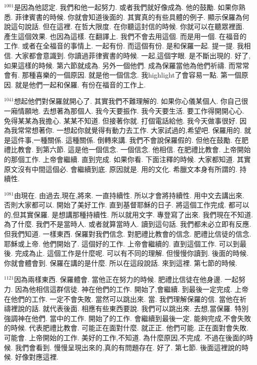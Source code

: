 \documentclass{book}
\begin{document}
$^{1001}$是因為他認定.
我們和他一起努力.
或者我們就好像成為.
他的鼓勵.
如果你熟悉.
菲律賓書的時候.
你就會知道後面的.
其實真的有些具體的例子.
顯示保羅為何說這句說話.
但在這裡.
在哲大限度.
在你聽這封信的時候.
你就可以在聽眾裡面.
產生這個效果.
也因為這樣.
在翻譯上.
我們不會去用這個.
而是用一個.
在福音的工作.
或者在全福音的事情上.
一起有份.
而這個有份.
是和保羅一起.
提一提.
我相信.
大家都會意識到.
你讀過菲律賓書的時候.
一起,這個字眼.
是不斷出現的.
好了,如果這樣的時候.
第六節就成為.
另外一個他們.
成為保羅當他為他們祈禱.
而常常會有.
那種喜樂的一個原因.
就是他一個信念.
我highlight了會容易一點.
第一個原因.
就是他們一起和保羅.
有份在福音的工作上.

$^{1041}$想起他們對保羅就開心了.
其實我們不難理解的.
如果你心儀某個人.
你自己很一廂情願地.
去想著為那個人.
我今天要振作.
我今天要生活.
要工作得開開心心.
免得某某為我擔心.
某某不知道.
但接著你就.
打個電話給他.
我今天做事很好.
因為我常常想著你.
一想起你就覺得有動力去工作.
大家試過的,希望吧.
保羅用的.
就是這件事,一種關係.
這種關係.
倒轉來講.
我們不會說保羅假的.
但他在鼓勵.
在肥禮比教會.
到第六節.
這是他一個信念.
一個信念.
他相信.
在肥禮比教會.
上帝開始的那個工作.
上帝會繼續.
直到完成.
如果你看.
下面注釋的時候.
大家都知道.
其實原文沒有中間這個必.
會繼續到底.
原因就是.
用的文化.
希臘文本身有所謂的.
持續性.

$^{1081}$由現在.
由過去,現在,將來.
一直持續性.
所以才會將持續性.
用中文去講出來.
否則大家都可以.
開始了美好工作.
直到基督耶穌的日子.
將這個工作完成.
都可以的,但其實保羅.
是想講那種持續性.
所以就用文字.
專登寫了出來.
我們現在不知道.
為了什麼.
我們不是當時人.
或者就算當時人.
讀到這句話.
我們都未必立即有反應.
但我們知道.
一樣東西.
保羅對我們信念.
對肥禮比教會的信念.
肥禮比信徒的信念.
耶穌或上帝.
他們開始了.
這個好的工作.
上帝會繼續的.
直到這個工作.
可以到最後.
完成為止.
這個工作是什麼呢.
可以有不同的理解.
但慢慢你讀到.
後面的時候.
你就會體會到.
保羅在講的是什麼.
所以在這段說話.
來到這裡.
第七節的時候.

$^{1121}$因為兩樣東西.
保羅體會.
當他正在努力的時候.
肥禮比信徒在他身邊.
一起努力.
因為他相信這群信徒.
神在他們的工作.
開始了,會繼續.
到最後一定完成.
上帝在他們的工作.
一定不會失敗.
當然可以跳出來.
當.
我們理解保羅的信.
當他在祈禱裡說的話.
就代表後面.
相應有些東西要說.
我們可以跳出來.
去想,當保羅.
特別強調神在他們.
當中的工作.
開始了的工作.
會繼續到最後一定.
能夠完成,不會失敗的時候.
代表肥禮比教會.
可能正在面對什麼.
就正正.
他們可能.
正在面對會失敗.
可能會.
上帝開始的工作.
美好的工作,不知道.
為什麼原因,不完成.
不過在後面的時候.
我們會看到.
慢慢呈現出來的,真的有問題存在.
好了.
第七節.
後面這裡說的時候.
好像對應這裡.
\end{document}
